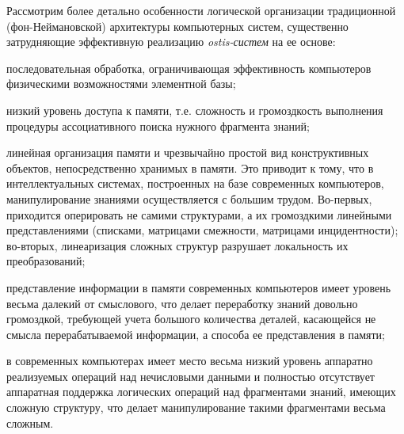 Рассмотрим более детально особенности логической организации традиционной (фон-Неймановской) архитектуры компьютерных систем, существенно затрудняющие эффективную реализацию \textit{ostis-систем} на ее основе:
\begin{textitemize}
	\item последовательная обработка, ограничивающая эффективность компьютеров физическими возможностями элементной базы;
	\item низкий уровень доступа к памяти, т.е. сложность и громоздкость выполнения процедуры ассоциативного поиска нужного фрагмента знаний; 
	\item линейная организация памяти и чрезвычайно простой вид конструктивных объектов, непосредственно хранимых в памяти. Это приводит к тому, что в интеллектуальных системах, построенных на базе современных компьютеров, манипулирование знаниями осуществляется с большим трудом. Во-первых, приходится оперировать не самими структурами, а их громоздкими линейными представлениями (списками, матрицами смежности, матрицами инцидентности); во-вторых, линеаризация сложных структур разрушает локальность их преобразований;
	\item представление информации в памяти современных компьютеров имеет уровень весьма далекий от смыслового, что делает переработку знаний довольно громоздкой, требующей учета большого количества деталей, касающейся не смысла перерабатываемой информации, а способа ее представления в памяти;
	\item в современных компьютерах имеет место весьма низкий уровень аппаратно реализуемых операций над нечисловыми данными и полностью отсутствует аппаратная поддержка логических операций над фрагментами знаний, имеющих сложную структуру, что делает манипулирование такими фрагментами весьма сложным.
\end{textitemize}

